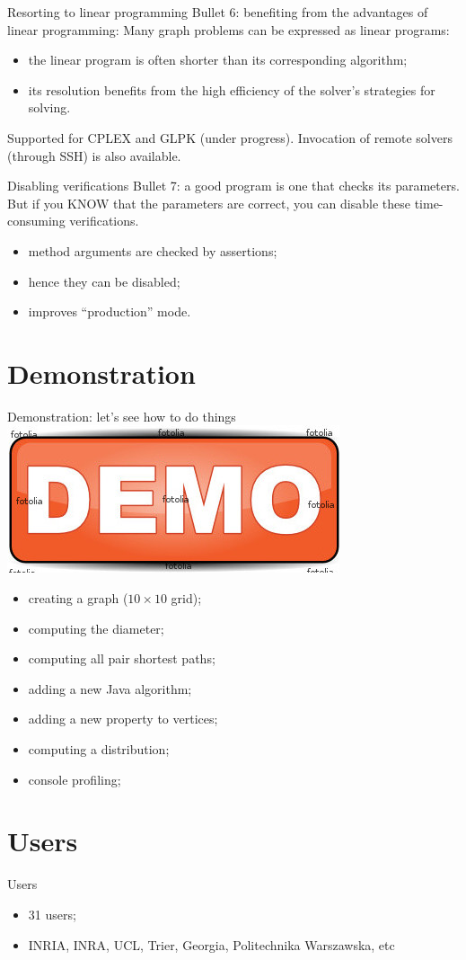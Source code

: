 \documentclass{beamer}
\newcommand{\sectionti}[1]{{\Huge #1}}
\newcommand{\demo}{\includegraphics[height=.5cm]{demo.jpg}}
\begin{document}
\begin{frame}{Resorting to linear programming}
\alert{Bullet 6}: benefiting from the advantages of linear programming:
Many graph problems can be expressed as linear programs:
\begin{itemize}
\item the linear program is often shorter than its corresponding algorithm;
\item its resolution benefits from the high efficiency of the solver's strategies for solving.
\end{itemize}
Supported for CPLEX and GLPK (under progress). Invocation of remote solvers (through SSH) is also available. 
\end{frame}


\begin{frame}{Disabling verifications}
\alert{Bullet 7}: a good program is one that checks its parameters. But if you KNOW that the parameters are correct, you can
\alert{disable these time-consuming verifications}.
\begin{itemize}
\item method arguments are checked by assertions;
\item hence they can be disabled;
\item improves ``production'' mode.
\end{itemize}
\end{frame}


\section{Demonstration}
\begin{frame}
\sectionti{Demonstration: let's see how to do things\demo}
	  \begin{itemize}
	    \item creating a graph ($10 \times 10$ grid);
	    \item computing the diameter;
	    \item computing all pair shortest paths;
	    \item adding a new Java algorithm;
	    \item adding a new property to vertices;
	    \item computing a distribution;
	    \item console profiling;
	  \end{itemize}
\end{frame}

\section{Users}
\begin{frame}
\sectionti{Users}
	  \begin{itemize}
	    \item 31 users;
	    \item INRIA, INRA, UCL, Trier, Georgia, Politechnika Warszawska, etc
	  \end{itemize}
\end{frame}
\end{document}
